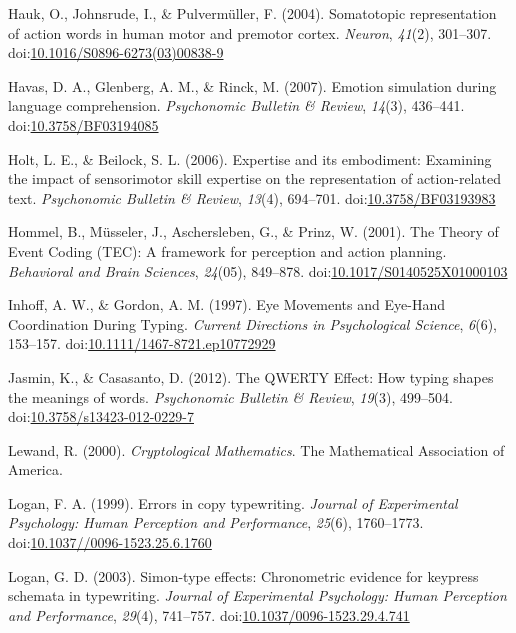 \documentclass[english,man]{apa6}
\theoremstyle{definition}
\theoremstyle{definition}
\theoremstyle{definition}
\theoremstyle{remark}
\begin{document}
\hypertarget{ref-Hauk2004}{}
Hauk, O., Johnsrude, I., \& Pulvermüller, F. (2004). Somatotopic
representation of action words in human motor and premotor cortex.
\emph{Neuron}, \emph{41}(2), 301--307.
doi:\href{https://doi.org/10.1016/S0896-6273(03)00838-9}{10.1016/S0896-6273(03)00838-9}

\hypertarget{ref-Havas2007}{}
Havas, D. A., Glenberg, A. M., \& Rinck, M. (2007). Emotion simulation
during language comprehension. \emph{Psychonomic Bulletin \& Review},
\emph{14}(3), 436--441.
doi:\href{https://doi.org/10.3758/BF03194085}{10.3758/BF03194085}

\hypertarget{ref-Holt2006}{}
Holt, L. E., \& Beilock, S. L. (2006). Expertise and its embodiment:
Examining the impact of sensorimotor skill expertise on the
representation of action-related text. \emph{Psychonomic Bulletin \&
Review}, \emph{13}(4), 694--701.
doi:\href{https://doi.org/10.3758/BF03193983}{10.3758/BF03193983}

\hypertarget{ref-Hommel2001}{}
Hommel, B., Müsseler, J., Aschersleben, G., \& Prinz, W. (2001). The
Theory of Event Coding (TEC): A framework for perception and action
planning. \emph{Behavioral and Brain Sciences}, \emph{24}(05), 849--878.
doi:\href{https://doi.org/10.1017/S0140525X01000103}{10.1017/S0140525X01000103}

\hypertarget{ref-Inhoff1997}{}
Inhoff, A. W., \& Gordon, A. M. (1997). Eye Movements and Eye-Hand
Coordination During Typing. \emph{Current Directions in Psychological
Science}, \emph{6}(6), 153--157.
doi:\href{https://doi.org/10.1111/1467-8721.ep10772929}{10.1111/1467-8721.ep10772929}

\hypertarget{ref-Jasmin2012}{}
Jasmin, K., \& Casasanto, D. (2012). The QWERTY Effect: How typing
shapes the meanings of words. \emph{Psychonomic Bulletin \& Review},
\emph{19}(3), 499--504.
doi:\href{https://doi.org/10.3758/s13423-012-0229-7}{10.3758/s13423-012-0229-7}

\hypertarget{ref-Lewand2000}{}
Lewand, R. (2000). \emph{Cryptological Mathematics}. The Mathematical
Association of America.

\hypertarget{ref-Logan1999}{}
Logan, F. A. (1999). Errors in copy typewriting. \emph{Journal of
Experimental Psychology: Human Perception and Performance},
\emph{25}(6), 1760--1773.
doi:\href{https://doi.org/10.1037//0096-1523.25.6.1760}{10.1037//0096-1523.25.6.1760}

\hypertarget{ref-Logan2003}{}
Logan, G. D. (2003). Simon-type effects: Chronometric evidence for
keypress schemata in typewriting. \emph{Journal of Experimental
Psychology: Human Perception and Performance}, \emph{29}(4), 741--757.
doi:\href{https://doi.org/10.1037/0096-1523.29.4.741}{10.1037/0096-1523.29.4.741}
\end{document}
